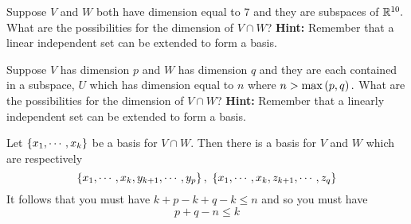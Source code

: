 \begin{enumialphparenastyle}
\begin{ex} Suppose $V$ and $W$ both have dimension equal to $7$ and they are
subspaces of $\mathbb{R}^{10}.$ What are the possibilities for the dimension
of $V\cap W$? \textbf{Hint: }Remember that a linear independent set can be
extended to form a basis. \vspace{1mm}
\end{ex}

\begin{ex} Suppose $V$ has dimension $p$ and $W$ has dimension $q$ and they
are each contained in a subspace, $U$ which has dimension equal to $n$ where 
$n>\max \left(p,q\right) .$ What are the possibilities for the dimension of 
$V\cap W$? \textbf{Hint: }Remember that a linearly independent set can be
extended to form a basis. \vspace{1mm}
\begin{sol}
Let $\left\{x_{1},\cdots ,x_{k}\right\} $ be a
basis for $V\cap W.$ Then there is a basis for $V$ and $W$ which are
respectively
\[
\left\{x_{1},\cdots ,x_{k},y_{k+1},\cdots ,y_{p}\right\} ,\ \left\{
x_{1},\cdots ,x_{k},z_{k+1},\cdots ,z_{q}\right\}
\]
It follows that you must have $k+p-k+q-k\leq n$ and so you must have
\[
p+q-n\leq k
\]
\end{sol}
\end{ex}


\end{enumialphparenastyle}
